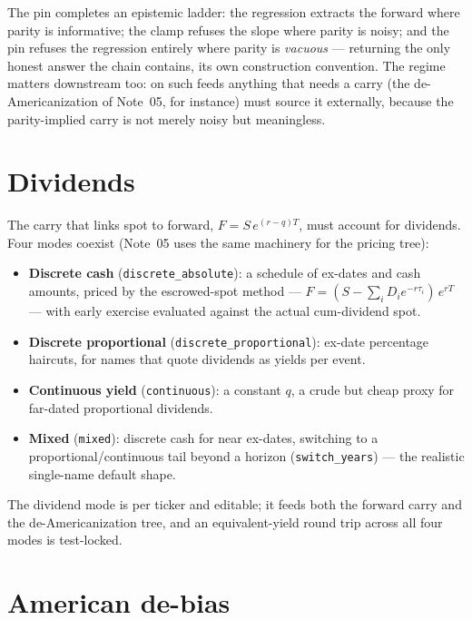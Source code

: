 \documentclass[11pt]{article}
\begin{document}
The pin completes an epistemic ladder: the regression extracts the forward
where parity is informative; the clamp refuses the slope where parity is
noisy; and the pin refuses the regression entirely where parity is
\emph{vacuous} --- returning the only honest answer the chain contains, its
own construction convention. The regime matters downstream too: on such feeds
anything that needs a carry (the de-Americanization of Note~05, for instance)
must source it externally, because the parity-implied carry is not merely
noisy but meaningless.

\section{Dividends}
\label{sec:divs}

The carry that links spot to forward, $F=S\,e^{(r-q)T}$, must account for
dividends. Four modes coexist (Note~05 uses the same machinery for the pricing
tree):
\begin{itemize}[leftmargin=1.4em]
\item \textbf{Discrete cash} (\texttt{discrete\_absolute}): a schedule of ex-dates
and cash amounts, priced by the escrowed-spot method ---
$F=(S-\sum_iD_ie^{-r\tau_i})\,e^{rT}$ --- with early exercise evaluated
against the actual cum-dividend spot.
\item \textbf{Discrete proportional} (\texttt{discrete\_proportional}): ex-date
percentage haircuts, for names that quote dividends as yields per event.
\item \textbf{Continuous yield} (\texttt{continuous}): a constant $q$, a crude but
cheap proxy for far-dated proportional dividends.
\item \textbf{Mixed} (\texttt{mixed}): discrete cash for near ex-dates,
switching to a proportional/continuous tail beyond a horizon
(\texttt{switch\_years}) --- the realistic single-name default shape.
\end{itemize}
The dividend mode is per ticker and editable; it feeds both the forward carry
and the de-Americanization tree, and an equivalent-yield round trip across all
four modes is test-locked.

\section{American de-bias}
\label{sec:debias}
\end{document}
